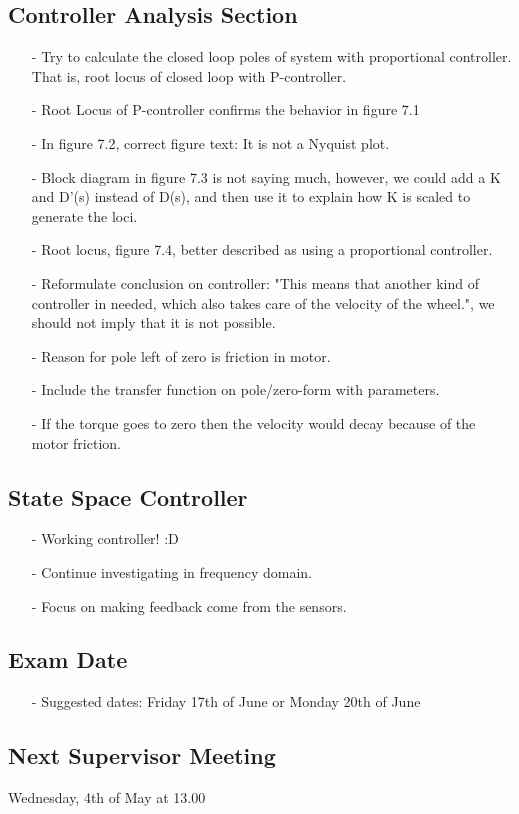 \subsection{Controller Analysis Section}
\begin{itemize}
  \item[-] Try to calculate the closed loop poles of system with proportional controller. That is, root locus of closed loop with P-controller.
  \item[-] Root Locus of P-controller confirms the behavior in figure 7.1
  \item[-] In figure 7.2, correct figure text: It is not a Nyquist plot.
  \item[-] Block diagram in figure 7.3 is not saying much, however, we could add a K and D'(s) instead of D(s), and then use it to explain how K is scaled to generate the loci.
  \item[-] Root locus, figure 7.4, better described as using a proportional controller.
  \item[-] Reformulate conclusion on controller: "This means that another kind of controller in needed, which also takes care of the velocity of the wheel.", we should not imply that it is not possible.
  \item[-] Reason for pole left of zero is friction in motor.
  \item[-] Include the transfer function on pole/zero-form with parameters.
  \item[-] If the torque goes to zero then the velocity would decay because of the motor friction.
\end{itemize}

\subsection{State Space Controller}
\begin{itemize}
  \item[-] Working controller! :D
  \item[-] Continue investigating in frequency domain.
  \item[-] Focus on making feedback come from the sensors.
\end{itemize}

\subsection{Exam Date}
\begin{itemize}
  \item[-] Suggested dates: Friday 17th of June or Monday 20th of June
\end{itemize}

\subsection{Next Supervisor Meeting}
Wednesday, 4th of May at 13.00


